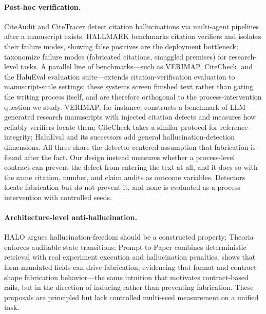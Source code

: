 \documentclass[10pt,twocolumn]{article}
\begin{document}
\paragraph{Post-hoc verification.}
CiteAudit \citep{shi2026citeaudit} and CiteTracer \citep{li2026citetracer} detect citation hallucinations via multi-agent pipelines after a manuscript exists. HALLMARK \citep{reizinger2026hallmark} benchmarks citation verifiers and isolates their failure modes, showing false positives are the deployment bottleneck; \citet{banerjee2026failuremodes} taxonomize failure modes (fabricated citations, smuggled premises) for research-level tasks. A parallel line of benchmarks---such as VERIMAP, CiteCheck, and the HaluEval evaluation suite---extends citation-verification evaluation to manuscript-scale settings; these systems screen finished text rather than gating the writing process itself, and are therefore orthogonal to the process-intervention question we study. VERIMAP, for instance, constructs a benchmark of LLM-generated research manuscripts with injected citation defects and measures how reliably verifiers locate them; CiteCheck takes a similar protocol for reference integrity; HaluEval and its successors add general hallucination-detection dimensions. All three share the detector-centered assumption that fabrication is found after the fact. Our design instead measures whether a process-level contract can prevent the defect from entering the text at all, and it does so with the same citation, number, and claim audits as outcome variables. Detectors locate fabrication but do not prevent it, and none is evaluated as a process intervention with controlled seeds.

\paragraph{Architecture-level anti-hallucination.}
HALO \citep{raduta2026halo} argues hallucination-freedom should be a constructed property; Theoria \citep{saldivar2026theoria} enforces auditable state transitions; Prompt-to-Paper \citep{kamran2026prompttopaper} combines deterministic retrieval with real experiment execution and hallucination penalties. \citet{usman2026phantomfill} shows that form-mandated fields can drive fabrication, evidencing that format and contract shape fabrication behavior---the same intuition that motivates contract-based rails, but in the direction of inducing rather than preventing fabrication. These proposals are principled but lack controlled multi-seed measurement on a unified task.
\end{document}
